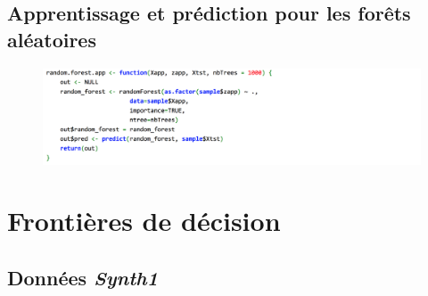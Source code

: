 \documentclass[a4paper,10pt]{report}
\begin{document}
\section{Apprentissage et prédiction pour les forêts aléatoires}
\label{appendix:functions-forrests}
\begin{figure}[H]
	\centering
	\captionsetup{justification=centering, margin=3cm}
	\includegraphics[width=0.9\linewidth]{img/C-random-forest-app-function}
	\label{fig:C-random-forest-app-function}
\end{figure}






\chapter{Frontières de décision}

\section{Données \textit{Synth1}}
\label{appendix:front-decision-synth-1}
\end{document}
